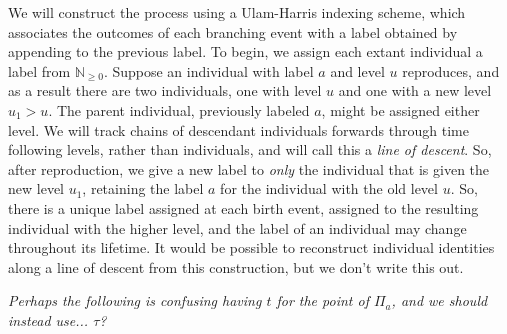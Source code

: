 \documentclass[12pt]{article}
\newcommand{\IN}{\mathbb N}
\newcommand{\comment}[1]{{\color{blue} \it #1}}
\begin{document}
We will construct the process using a Ulam-Harris indexing scheme,
which associates the outcomes of each branching event with a label obtained
by appending to the previous label.
To begin, we assign each extant individual a label from $\IN_{\ge 0}$.
Suppose an individual with label $a$ and level $u$ reproduces,
and as a result there are two individuals, one with level $u$ and one with a new level $u_1 > u$.
The parent individual, previously labeled $a$, might be assigned either level.
We will track chains of descendant individuals forwards through time
following levels, rather than individuals, and will call this a \emph{line of descent}.
So, after reproduction, we give a new label to \emph{only} the individual
that is given the new level $u_1$,
retaining the label $a$ for the individual with the old level $u$.
So, there is a unique label assigned at each birth event,
assigned to the resulting individual with the higher level,
and the label of an individual may change throughout its lifetime.
It would be possible to reconstruct individual identities along a line of descent
from this construction,
but we don't write this out.

\comment{Perhaps the following is confusing having $t$ for the point of $\Pi_a$,
and we should instead use... $\tau$?}
\end{document}
